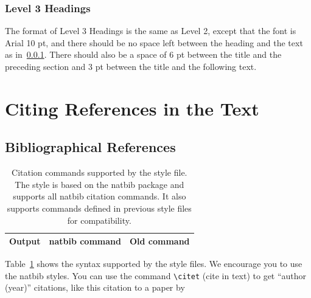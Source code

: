 \documentclass[10pt, a4paper]{article}
\begin{document}
\subsubsection{Level 3 Headings}%
\label{level3H}

The format of Level 3 Headings is the same as Level 2, except that the font is Arial 10 pt, and there should be no space left between the heading and the text as in~\ref{level3H}. There should also be a space of 6 pt between the title and the preceding section and 3 pt between the title and the following text.

\section{Citing References in the Text}

\subsection{Bibliographical References}


\begin{table}
\centering
\begin{tabular}{lll}
\hline
\textbf{Output} & \textbf{natbib command} & \textbf{Old command}\\
\hline
\hline
\end{tabular}
\caption{\label{citation-guide} Citation commands supported by the style file. The style is based on the natbib package and supports all natbib citation commands. It also supports commands defined in previous style files for compatibility.}
\end{table}

Table~\ref{citation-guide} shows the syntax supported by the style files. We encourage you to use the natbib styles.
You can use the command \verb|\citet| (cite in text) to get ``author (year)'' citations, like this citation to a paper by %
\end{document}
